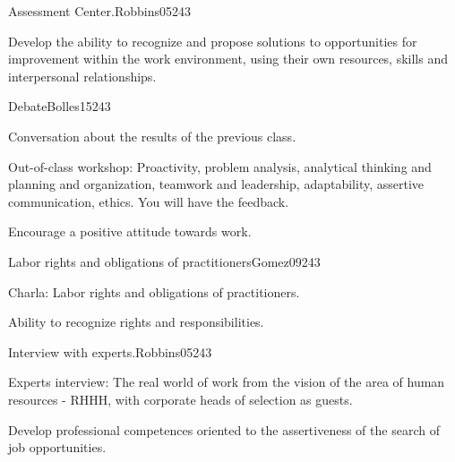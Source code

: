 \begin{syllabus}
\begin{unit}{Assessment Center.}{}{Robbins05}{24}{3}
   \begin{learningoutcomes}
      \item Develop the ability to recognize and propose solutions to opportunities for improvement within the work environment, using their own resources, skills and interpersonal relationships.
   \end{learningoutcomes}
\end{unit}

\begin{unit}{Debate}{}{Bolles15}{24}{3}
   \begin{topics}
      \item Conversation about the results of the previous class.
      \item Out-of-class workshop: Proactivity, problem analysis, analytical thinking and planning and organization, teamwork and leadership, adaptability, assertive communication, ethics. You will have the feedback.
   \end{topics}

   \begin{learningoutcomes}
      \item Encourage a positive attitude towards work.
   \end{learningoutcomes}
\end{unit}

\begin{unit}{Labor rights and obligations of practitioners}{}{Gomez09}{24}{3}
   \begin{topics}
      \item Charla: Labor rights and obligations of practitioners.
   \end{topics}
   \begin{learningoutcomes}
      \item Ability to recognize rights and responsibilities.
   \end{learningoutcomes}
\end{unit}

\begin{unit}{Interview with experts.}{}{Robbins05}{24}{3}
   \begin{topics}
      \item Experts interview: The real world of work from the vision of the area of human resources - RHHH, with corporate heads of selection as guests.
   \end{topics}
   \begin{learningoutcomes}
      \item Develop professional competences oriented to the assertiveness of the search of job opportunities.
   \end{learningoutcomes}
\end{unit}


\end{syllabus}
